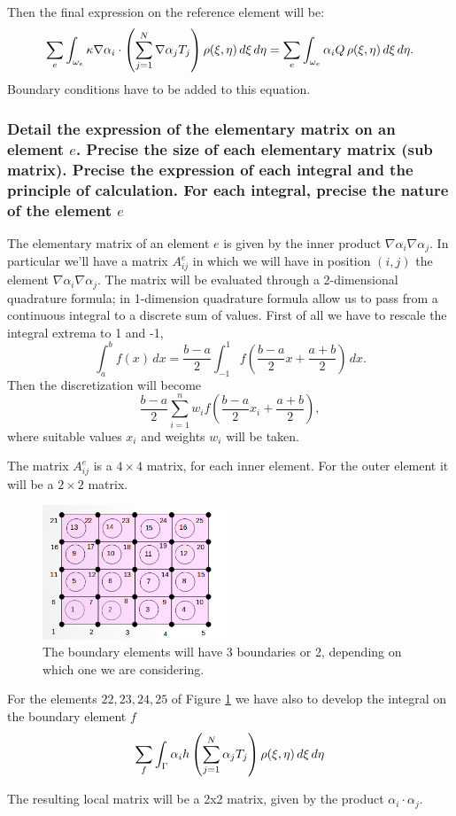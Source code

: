 Then the final expression on the reference element will be:
\begin{align*}
\sum_e\int_{\omega_e}\kappa\nabla\alpha_i\cdot\left(\sum_{j=1}^{N}\nabla\alpha_jT_j \right) \rho(\xi,\eta)\mathop{}\!d\xi\mathop{}\!d\eta = \sum_e\int_{\omega_e}\alpha_iQ\,\rho(\xi,\eta)\mathop{}\!d\xi\mathop{}\!d\eta.
\end{align*}
Boundary conditions have to be added to this equation.

\subsubsection{Detail the expression of the elementary matrix on an element $ e $. Precise the size of each elementary matrix (sub matrix). Precise the expression of each integral and the principle of calculation. For each integral, precise the nature of the element $ e $} 

The elementary matrix of an element $ e $ is given by the inner product $ \nabla\alpha_i\nabla\alpha_j $. In particular we'll have a matrix $ A_{ij}^e $ in which we will have in position $ (i,j) $ the element $ \nabla\alpha_i\nabla\alpha_j $. 
The matrix will be evaluated through a 2-dimensional quadrature formula; in 1-dimension quadrature formula allow us to pass from a continuous integral to a discrete sum of values. First of all we have to rescale the integral extrema to 1 and -1,
\[\int_{a}^{b}f(x)\,dx = \frac{b-a}{2}\int_{-1}^{1}f\left(\frac {b-a}{2}x+ \frac{a+b}{2}\right)\, dx. \]
Then the discretization will become
\[ \frac{b-a}{2} \sum_{i=1}^{n}w_{i}f\left(\frac {b-a}{2}x_{i}+ \frac{a+b}{2}\right),\]
where suitable values $ x_i $ and weights $ w_i $ will be taken.

The matrix $ A_{ij}^e $ is a $ 4\times4 $ matrix, for each inner element. For the outer element it will be a $ 2\times2 $ matrix. 
\begin{figure}
	\centering
	\includegraphics[height=4cm]{Images/mesh.png}
	\caption{The boundary elements will have 3 boundaries or 2, depending on which one we are considering.}
	\label{Img:sample_mesh}
\end{figure}

For the elements $ 22,23,24,25 $ of Figure \ref{Img:sample_mesh} we have also to develop the integral on the boundary element $ f $
\[\sum_f\int_{\Gamma}\alpha_i h\left(\sum_{j=1}^{N}\alpha_jT_j\right)\rho(\xi,\eta)\mathop{}\!d\xi\mathop{}\!d \eta \]

The resulting local matrix will be a 2x2 matrix, given by the product $ \alpha_i\cdot\alpha_j $.


